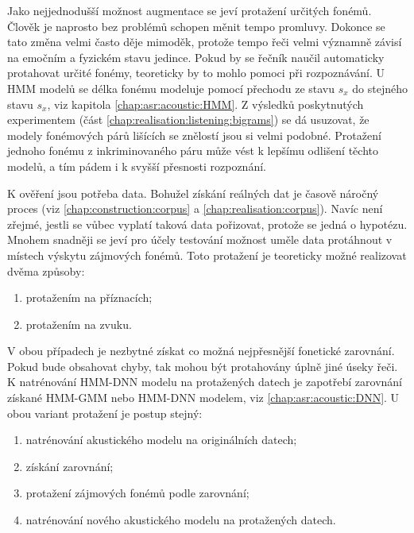 Jako nejjednodušší možnost augmentace se jeví protažení určitých fonémů.
Člověk je naprosto bez problémů schopen měnit tempo promluvy.
Dokonce se tato změna velmi často děje mimoděk, protože tempo řeči velmi významně závisí na emočním a fyzickém stavu jedince.
Pokud by se řečník naučil automaticky protahovat určité fonémy, teoreticky by to mohlo pomoci při rozpoznávání.
U HMM modelů se délka fonému modeluje pomocí přechodu ze stavu $s_x$ do stejného stavu $s_x$, viz kapitola \ref{chap:asr:acoustic:HMM}.
Z výsledků poskytnutých  experimentem (část \ref{chap:realisation:listening:bigrams}) se dá usuzovat, že modely fonémových párů lišících se znělostí jsou si velmi podobné.
Protažení jednoho fonému z inkriminovaného páru může vést k lepšímu odlišení těchto modelů,
a tím pádem i k svyšší přesnosti rozpoznání.

K ověření jsou potřeba data.
Bohužel získání reálných dat je časově náročný proces (viz \ref{chap:construction:corpus} a \ref{chap:realisation:corpus}).
Navíc není zřejmé, jestli se vůbec vyplatí taková data pořizovat, protože se jedná o hypotézu.
Mnohem snadněji se jeví pro účely testování možnost uměle data protáhnout v místech výskytu zájmových fonémů.
Toto protažení je teoreticky možné realizovat dvěma způsoby:

\begin{enumerate}
  \item protažením na příznacích;
  \item protažením na zvuku.
\end{enumerate}

\noindent V obou případech je nezbytné získat co možná nejpřesnější fonetické zarovnání. Pokud bude obsahovat chyby, tak mohou být protahovány úplně jiné úseky řeči. K natrénování HMM-DNN modelu na protažených datech je zapotřebí zarovnání získané HMM-GMM nebo HMM-DNN modelem, viz \ref{chap:asr:acoustic:DNN}. U obou variant protažení je postup stejný:

\begin{enumerate}
  \item natrénování akustického modelu na originálních datech;
  \item získání zarovnání;
  \item protažení zájmových fonémů podle zarovnání;
  \item natrénování nového akustického modelu na protažených datech.
\end{enumerate}

